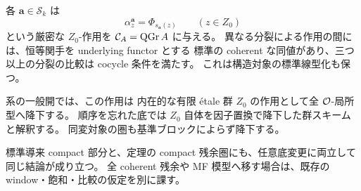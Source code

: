 \begin{theorem}
\label{mbza:thm:central-action}
各 $\boldsymbol a\in\mathscr S_k$ は
\[
 \alpha^{\boldsymbol a}_z=\Phi_{s_{\boldsymbol a}(z)}
 \qquad(z\in Z_0)
\]
という厳密な $Z_0$-作用を $\mathcal C_A=\operatorname{QGr} A$ に与える。
異なる分裂による作用の間には、恒等関手を underlying functor とする
標準の coherent な同値があり、三つ以上の分裂の比較は cocycle 条件を満たす。
これは構造対象の標準線型化も保つ。

系の一般開では、この作用は
内在的な有限 \'etale 群 $Z_0$ の作用として全 $\mathcal O$-局所型へ降下する。
順序を忘れた底では $Z_0$ 自体を因子置換で降下した群スキームと解釈する。
同変対象の圏も基準ブロックによらず降下する。

標準導来 compact 部分と、定理の
compact 残余圏にも、任意底変更に両立して同じ結論が成り立つ。
全 coherent 残余や MF 模型へ移す場合は、既存の window・飽和・比較の仮定を別に課す。
\end{theorem}
